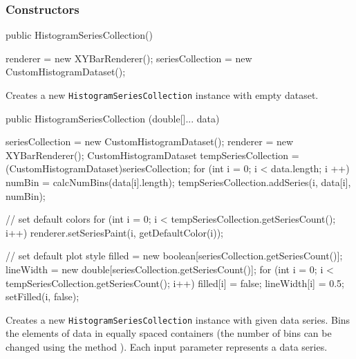 \subsubsection*{Constructors}

\begin{code}
   public HistogramSeriesCollection() \begin{hide} {
      renderer = new XYBarRenderer();
      seriesCollection = new CustomHistogramDataset();
   }\end{hide}
\end{code}
\begin{tabb}
   Creates a new \texttt{HistogramSeriesCollection} instance with empty dataset.
\end{tabb}
\begin{code}

   public HistogramSeriesCollection (double[]... data) \begin{hide} {
      seriesCollection = new CustomHistogramDataset();
      renderer = new XYBarRenderer();
      CustomHistogramDataset tempSeriesCollection =
             (CustomHistogramDataset)seriesCollection;
      for (int i = 0; i < data.length; i ++) {
         numBin = calcNumBins(data[i].length);
         tempSeriesCollection.addSeries(i, data[i], numBin);
      }

      // set default colors
      for (int i = 0; i < tempSeriesCollection.getSeriesCount(); i++) {
         renderer.setSeriesPaint(i, getDefaultColor(i));
      }

      // set default plot style
      filled = new boolean[seriesCollection.getSeriesCount()];
      lineWidth = new double[seriesCollection.getSeriesCount()];
      for (int i = 0; i < tempSeriesCollection.getSeriesCount(); i++) {
         filled[i] = false;
         lineWidth[i] = 0.5;
         setFilled(i, false);
      }
   }\end{hide}
\end{code}
\begin{tabb}
   Creates a new \texttt{HistogramSeriesCollection} instance with given data series.
   Bins the elements of data in equally spaced containers (the number of bins
   can be changed using the method ).
   Each input parameter %
   represents a data series.
\end{tabb}
\begin{htmlonly}
\end{htmlonly}
